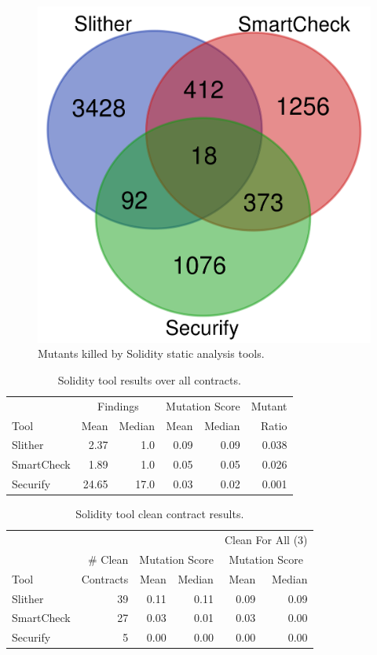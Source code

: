 \begin{figure}
  \includegraphics[width=0.6\columnwidth]{solidity.png}
  \caption{Mutants killed by Solidity static analysis tools.}
  \label{fig:solidityvenn}
\end{figure}

\begin{table}
  \begin{tabular}{l|r|r|r|r|r}
    & \multicolumn{2}{|c|}{Findings} & \multicolumn{2}{|c|}{Mutation Score}  & Mutant \\
    Tool & Mean & Median & Mean & Median & Ratio\\
    \hline
    \hline
    Slither & 2.37 & 1.0 & 0.09 & 0.09 & 0.038 \\
    \hline
    SmartCheck & 1.89 & 1.0 & 0.05 & 0.05 & 0.026 \\
    \hline
    Securify & 24.65 & 17.0 & 0.03 & 0.02 &  0.001 \\
    \hline
  \end{tabular}
  \caption{Solidity tool results over all contracts.}
  \label{tab:scoresolidity}
\end{table}

\begin{table}
  \begin{tabular}{l|r|r|r|r|r}
    & & \multicolumn{2}{|c|}{} & \multicolumn{2}{|c}{Clean For All (3)} \\
    & \# Clean & \multicolumn{2}{|c|}{Mutation Score} &  \multicolumn{2}{|c}{Mutation Score}\\
    Tool & Contracts & Mean & Median & Mean & Median\\
    \hline
    \hline
    Slither & 39 & 0.11 & 0.11 & 0.09 & 0.09 \\
    \hline
    SmartCheck & 27 & 0.03 & 0.01 & 0.03 & 0.00 \\
    \hline
    Securify & 5 & 0.00 & 0.00 & 0.00 & 0.00 \\
    \hline
  \end{tabular}
  \caption{Solidity tool clean contract results.}
  \label{tab:cleansolidity}
\end{table}


